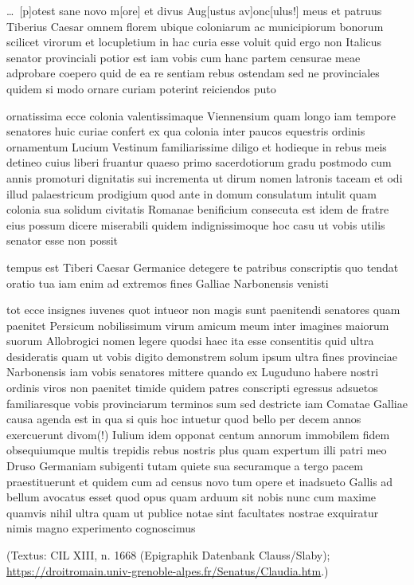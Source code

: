\dots\ [p]otest sane novo m[ore] et divus Aug[ustus av]onc[ulus!] meus et patruus Tiberius Caesar omnem florem ubique coloniarum ac municipiorum bonorum scilicet virorum et locupletium in hac curia esse voluit quid ergo non Italicus senator provinciali potior est iam vobis cum hanc partem censurae meae adprobare coepero quid de ea re sentiam rebus ostendam sed ne provinciales quidem si modo ornare curiam poterint reiciendos puto

ornatissima ecce colonia valentissimaque Viennensium quam longo iam tempore senatores huic curiae confert ex qua colonia inter paucos equestris ordinis ornamentum Lucium Vestinum familiarissime diligo et hodieque in rebus meis detineo cuius liberi fruantur quaeso primo sacerdotiorum gradu postmodo cum annis promoturi dignitatis sui incrementa ut dirum nomen latronis taceam et odi illud palaestricum prodigium quod ante in domum consulatum intulit quam colonia sua solidum civitatis Romanae benificium consecuta est idem de fratre eius possum dicere miserabili quidem indignissimoque hoc casu ut vobis utilis senator esse non possit 

tempus est Tiberi Caesar Germanice detegere te patribus conscriptis quo tendat oratio tua iam enim ad extremos fines Galliae Narbonensis venisti 

tot ecce insignes iuvenes quot intueor non magis sunt paenitendi 
senatores quam paenitet Persicum nobilissimum virum amicum meum inter
imagines maiorum suorum Allobrogici nomen legere quodsi haec ita esse
consentitis quid ultra desideratis quam ut vobis digito demonstrem
solum ipsum ultra fines provinciae Narbonensis iam vobis senatores
mittere quando ex Luguduno habere nostri ordinis viros non paenitet
timide quidem patres conscripti egressus adsuetos familiaresque
vobis provinciarum terminos sum sed destricte iam Comatae Galliae 
causa agenda est in qua si quis hoc intuetur quod bello per decem
annos exercuerunt divom(!) Iulium idem opponat centum annorum
immobilem fidem obsequiumque multis trepidis rebus nostris plus quam
expertum illi patri meo Druso Germaniam subigenti tutam quiete sua
securamque a tergo pacem praestituerunt et quidem cum ad census novo
tum opere et inadsueto Gallis ad bellum avocatus esset quod opus quam
arduum sit nobis nunc cum maxime quamvis nihil ultra quam ut
publice notae sint facultates nostrae exquiratur nimis magno
experimento cognoscimus

\noindent (Textus: CIL XIII, n. 1668 (Epigraphik Datenbank Clauss/Slaby); \url{https://droitromain.univ-grenoble-alpes.fr/Senatus/Claudia.htm}.)

